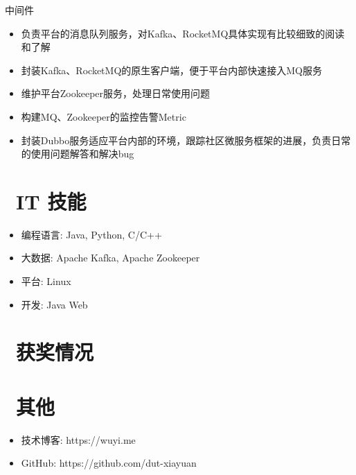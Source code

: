\documentclass{resume}
\begin{document}
中间件
\begin{itemize}
    \item 负责平台的消息队列服务，对Kafka、RocketMQ具体实现有比较细致的阅读和了解
    \item 封装Kafka、RocketMQ的原生客户端，便于平台内部快速接入MQ服务
    \item 维护平台Zookeeper服务，处理日常使用问题
    \item 构建MQ、Zookeeper的监控告警Metric
    \item 封装Dubbo服务适应平台内部的环境，跟踪社区微服务框架的进展，负责日常的使用问题解答和解决bug
\end{itemize}

\section{\faCogs\ IT 技能}
\begin{itemize}[parsep=0.5ex]
  \item 编程语言: Java, Python, C/C++
  \item 大数据: Apache Kafka, Apache Zookeeper
  \item 平台: Linux
  \item 开发: Java Web
\end{itemize}

\section{\faHeartO\ 获奖情况}

\section{\faInfo\ 其他}
\begin{itemize}[parsep=0.5ex]
  \item 技术博客: https://wuyi.me
  \item GitHub: https://github.com/dut-xiayuan
\end{itemize}
\end{document}

